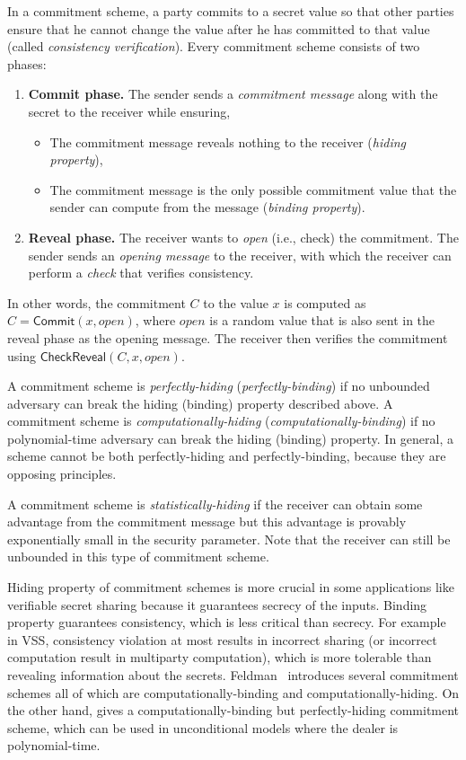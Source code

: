 \documentclass[10pt]{article}
\theoremstyle{plain}
\begin{document}
In a commitment scheme, a party commits to a secret value so that
other parties ensure that he cannot change the value after he has
committed to that value (called \emph{consistency verification}).
Every commitment scheme consists of two phases: 
\begin{enumerate}
	\item \textbf{Commit phase.} The sender sends a \emph{commitment message}
	along with the secret to the receiver while ensuring, 
	\begin{itemize}
		\item The commitment message reveals nothing to the receiver (\emph{hiding
			property}), 
		\item The commitment message is the only possible commitment value that
		the sender can compute from the message (\emph{binding property}). 
	\end{itemize}
	\item \textbf{Reveal phase.} The receiver wants to \emph{open} (i.e., check)
	the commitment. The sender sends an \emph{opening message} to the
	receiver, with which the receiver can perform a \emph{check} that
	verifies consistency. 
\end{enumerate}
In other words, the commitment $C$ to the value $x$ is computed
as $C=\mathsf{Commit}(x,open)$, where $open$ is a random value that
is also sent in the reveal phase as the opening message. The receiver
then verifies the commitment using $\mathsf{CheckReveal}(C,x,open)$.

A commitment scheme is \emph{perfectly-hiding} (\emph{perfectly-binding})
if no unbounded adversary can break the hiding (binding) property
described above. A commitment scheme is \emph{computationally-hiding}
(\emph{computationally-binding}) if no polynomial-time adversary can
break the hiding (binding) property. In general, a scheme cannot be
both perfectly-hiding and perfectly-binding, because they are opposing
principles.

A commitment scheme is \emph{statistically-hiding} if the receiver
can obtain some advantage from the commitment message but this advantage
is provably exponentially small in the security parameter. Note that
the receiver can still be unbounded in this type of commitment scheme.

Hiding property of commitment schemes is more crucial in some applications
like verifiable secret sharing because it guarantees secrecy of the
inputs. Binding property guarantees consistency, which is less critical
than secrecy. For example in VSS, consistency violation at most results
in incorrect sharing (or incorrect computation result in multiparty
computation), which is more tolerable than revealing information about
the secrets. Feldman~\cite{Feldman:1987:PSN:1382440.1383000} introduces
several commitment schemes all of which are computationally-binding
and computationally-hiding. On the other hand, \cite{Pedersen:1991:NIS:646756.705507}
gives a computationally-binding but perfectly-hiding commitment scheme,
which can be used in unconditional models where the dealer is polynomial-time.
\end{document}

